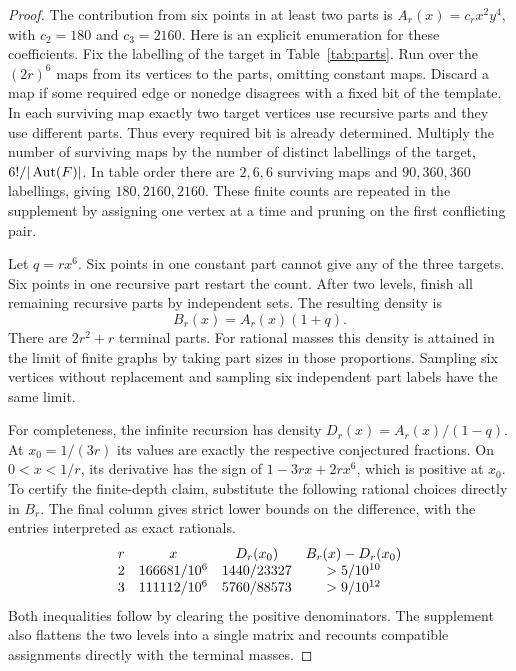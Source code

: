 \begin{proof}
The contribution from six points in at least two parts is
\(A_r(x)=c_r x^2y^4\), with \(c_2=180\) and \(c_3=2160\).
Here is an explicit enumeration for these coefficients. Fix the
labelling of the target in Table~\ref{tab:parts}. Run over the
\((2r)^6\) maps from its vertices to the parts, omitting constant maps.
Discard a map if some required edge or nonedge disagrees with a fixed
bit of the template. In each surviving map exactly two target vertices
use recursive parts and they use different parts. Thus every required
bit is already determined. Multiply the number of surviving maps by
the number of distinct labellings of the target, \(6!/|\operatorname{Aut}(F)|\).
In table order there are \(2,6,6\) surviving maps and \(90,360,360\)
labellings, giving \(180,2160,2160\).
These finite counts are repeated in the supplement by assigning one
vertex at a time and pruning on the first conflicting pair.

Let \(q=rx^6\). Six points in one constant part cannot give any of the
three targets. Six points in one recursive part restart the count.
After two levels, finish all remaining recursive parts by independent
sets. The resulting density is
\[
 B_r(x)=A_r(x)(1+q).
\]
There are \(2r^2+r\) terminal parts. For rational masses this density
is attained in the limit of finite graphs by taking part sizes in those
proportions. Sampling six vertices without replacement and sampling
six independent part labels have the same limit.

For completeness, the infinite recursion has density
\(D_r(x)=A_r(x)/(1-q)\). At \(x_0=1/(3r)\) its values are exactly
the respective conjectured fractions. On \(0<x<1/r\), its derivative
has the sign of \(1-3rx+2rx^6\), which is positive at \(x_0\).
To certify the finite-depth claim, substitute the following rational
choices directly in \(B_r\). The final column gives strict lower
bounds on the difference, with the entries interpreted as exact rationals.
\[
\begin{array}{c c c c}
 r & x & D_r(x_0) & B_r(x)-D_r(x_0)\\
 2 & 166681/10^6 & 1440/23327 & >5/10^{10}\\
 3 & 111112/10^6 & 5760/88573 & >9/10^{12}
\end{array}
\]
Both inequalities follow by clearing the positive denominators. The
supplement also flattens the two levels into a single matrix and
recounts compatible assignments directly with the terminal masses.
\end{proof}
